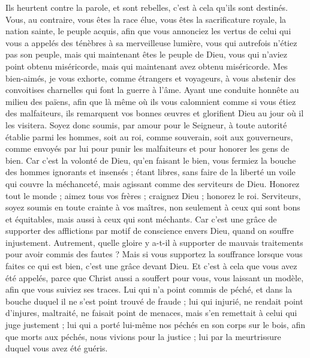 \begin{multicols}{2}
Ils heurtent contre la parole, et sont rebelles, c’est à cela qu’ils sont destinés.
Vous, au contraire, vous êtes la race élue, vous êtes la sacrificature royale, la nation sainte, le peuple acquis, afin que vous annonciez les vertus de celui qui vous a appelés des ténèbres à sa merveilleuse lumière,
vous qui autrefois n'étiez pas son peuple, mais qui maintenant êtes le peuple de Dieu, vous qui n'aviez point obtenu miséricorde, mais qui maintenant avez obtenu miséricorde.
Mes bien-aimés, je vous exhorte, comme étrangers et voyageurs, à vous abstenir des convoitises charnelles qui font la guerre à l'âme.
Ayant une conduite honnête au milieu des païens, afin que là même où ils vous calomnient comme si vous étiez des malfaiteurs, ils remarquent vos bonnes œuvres et glorifient Dieu au jour où il les visitera.
Soyez donc soumis, par amour pour le Seigneur, à toute autorité établie parmi les hommes, soit au roi, comme souverain,
soit aux gouverneurs, comme envoyés par lui pour punir les malfaiteurs et pour honorer les gens de bien.
Car c'est la volonté de Dieu, qu'en faisant le bien, vous fermiez la bouche des hommes ignorants et insensés ;
étant libres, sans faire de la liberté un voile qui couvre la méchanceté, mais agissant comme des serviteurs de Dieu.
Honorez tout le monde ; aimez tous vos frères ; craignez Dieu ; honorez le roi.
Serviteurs, soyez soumis en toute crainte à vos maîtres, non seulement à ceux qui sont bons et équitables, mais aussi à ceux qui sont méchants.
Car c’est une grâce de supporter des afflictions par motif de conscience envers Dieu, quand on souffre injustement.
Autrement, quelle gloire y a-t-il à supporter de mauvais traitements pour avoir commis des fautes ? Mais si vous supportez la souffrance lorsque vous faites ce qui est bien, c’est une grâce devant Dieu.
Et c’est à cela que vous avez été appelés, parce que Christ aussi a souffert pour vous, vous laissant un modèle, afin que vous suiviez ses traces.
Lui qui n'a point commis de péché, et dans la bouche duquel il ne s’est point trouvé de fraude ;
lui qui injurié, ne rendait point d’injures, maltraité, ne faisait point de menaces, mais s’en remettait à celui qui juge justement ;
lui qui a porté lui-même nos péchés en son corps sur le bois, afin que morts aux péchés, nous vivions pour la justice ; lui par la meurtrissure duquel vous avez été guéris.

\end{multicols}
